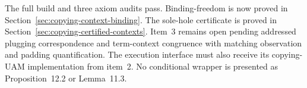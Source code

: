 



The full build and three axiom audits pass. Binding-freedom is now proved in
Section~\ref{sec:copying-context-binding}. The sole-hole certificate is proved in
Section~\ref{sec:copying-certified-contexts}. Item~3 remains open pending addressed
plugging correspondence and term-context congruence with matching observation
and padding quantification. The execution interface
must also receive its copying-UAM implementation from item~2. No conditional
wrapper is presented as Proposition~12.2 or Lemma~11.3.
